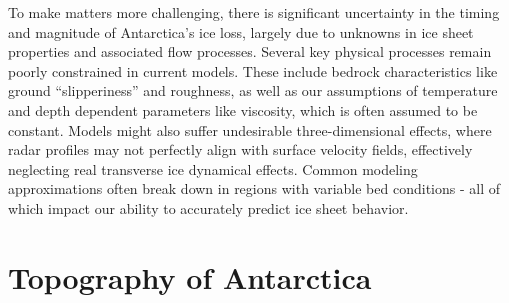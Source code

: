 To make matters more challenging, there is significant uncertainty in the timing and magnitude of Antarctica's ice loss, largely due to unknowns in ice sheet properties and associated flow processes\cite{IPCC}. Several key physical processes remain poorly constrained in current models. These include bedrock characteristics like ground ``slipperiness'' and roughness, as well as our assumptions of temperature and depth dependent parameters like viscosity, which is often assumed to be constant. Models might also suffer undesirable three-dimensional effects, where radar profiles may not perfectly align with surface velocity fields, effectively neglecting real transverse ice dynamical effects. Common modeling approximations often break down in regions with variable bed conditions - all of which impact our ability to accurately predict ice sheet behavior\cite{Ockenden_2022}.

\chapter{Topography of Antarctica}\label{review}

